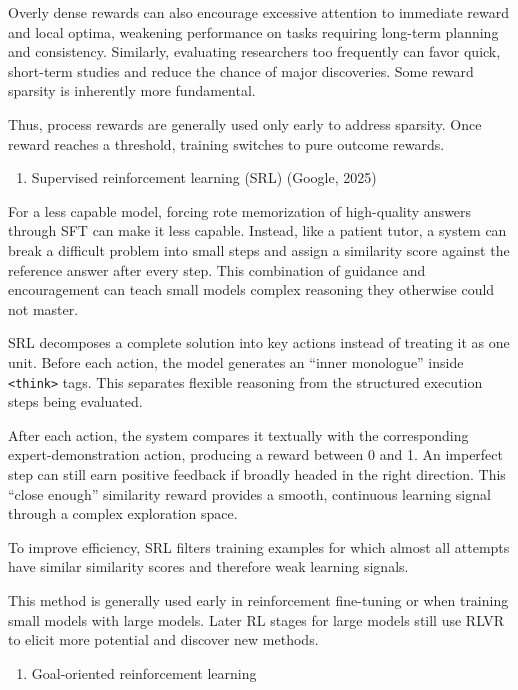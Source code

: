 Overly dense rewards can also encourage excessive attention to immediate reward and local optima, weakening performance on tasks requiring long-term planning and consistency. Similarly, evaluating researchers too frequently can favor quick, short-term studies and reduce the chance of major discoveries. Some reward sparsity is inherently more fundamental.

Thus, process rewards are generally used only early to address sparsity. Once reward reaches a threshold, training switches to pure outcome rewards.

\begin{enumerate}
\def\labelenumi{\arabic{enumi}.}
\setcounter{enumi}{1}
\tightlist
\item
  Supervised reinforcement learning (SRL) (Google, 2025)
\end{enumerate}

For a less capable model, forcing rote memorization of high-quality answers through SFT can make it less capable. Instead, like a patient tutor, a system can break a difficult problem into small steps and assign a similarity score against the reference answer after every step. This combination of guidance and encouragement can teach small models complex reasoning they otherwise could not master.

SRL decomposes a complete solution into key actions instead of treating it as one unit. Before each action, the model generates an ``inner monologue'' inside \texttt{\textless{}think\textgreater{}} tags. This separates flexible reasoning from the structured execution steps being evaluated.

After each action, the system compares it textually with the corresponding expert-demonstration action, producing a reward between 0 and 1. An imperfect step can still earn positive feedback if broadly headed in the right direction. This ``close enough'' similarity reward provides a smooth, continuous learning signal through a complex exploration space.

To improve efficiency, SRL filters training examples for which almost all attempts have similar similarity scores and therefore weak learning signals.

This method is generally used early in reinforcement fine-tuning or when training small models with large models. Later RL stages for large models still use RLVR to elicit more potential and discover new methods.

\begin{enumerate}
\def\labelenumi{\arabic{enumi}.}
\setcounter{enumi}{2}
\tightlist
\item
  Goal-oriented reinforcement learning
\end{enumerate}

